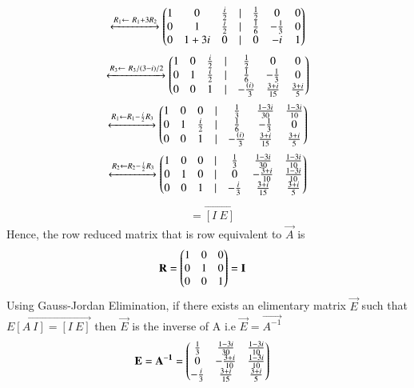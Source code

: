 \documentclass[journal,12pt,twocolumn]{IEEEtran}
\begin{document}
\begin{align}
\xleftrightarrow[]{R_1 \leftarrow \ R_1 + 3R_2}
                \begin{pmatrix} 1 & 0 & \frac{i}{2} &| & \frac{1}{2} & 0 & 0 \\
			0 & 1 & \frac{i}{2}&| & \frac{1}{6} & -\frac{1}{3} & 0 \\
			0 & 1+3i & 0 &| & 0 & -i & 1\end{pmatrix}
\end{align}
\begin{align}
\xleftrightarrow[]{R_3 \leftarrow \ R_3/(3-i)/2}
                \begin{pmatrix} 1 & 0 & \frac{i}{2} &| & \frac{1}{2} & 0 & 0 \\
			0 & 1 & \frac{i}{2}&| & \frac{1}{6} & -\frac{1}{3} & 0 \\
			0 & 0 & 1&| &-\frac{(i)}{3} & \frac{3+i}{15} & \frac{3+i}{5}\end{pmatrix}
\end{align}
\begin{align}
\xleftrightarrow[]{R_1 \leftarrow R_1-\frac{i}{2}R_3}
                \begin{pmatrix} 1 & 0 & 0 &| & \frac{1}{3} & \frac{1-3i}{30} & \frac{1-3i}{10} \\
			0 & 1 & \frac{i}{2}&| & \frac{1}{6} & -\frac{1}{3} & 0 \\
			0 & 0 & 1&| &-\frac{(i)}{3} & \frac{3+i}{15} & \frac{3+i}{5}\end{pmatrix}
\end{align}
\begin{align}
\xleftrightarrow[]{R_2 \leftarrow R_2-\frac{i}{2}R_3}
                \begin{pmatrix} 1 & 0 & 0 &| & \frac{1}{3} & \frac{1-3i}{30} & \frac{1-3i}{10} \\
			0 & 1 & 0 &| & 0 & -\frac{3+i}{10}& \frac{1-3i}{10} \\
			0 & 0 & 1&| &-\frac{i}{3} & \frac{3+i}{15} & \frac{3+i}{5}\end{pmatrix}			
\end{align}
\begin{align}
&= \vec{[I \ E]}\nonumber
\end{align}
Hence, the row reduced matrix that is row equivalent to $\vec{A}$ is 
\begin{align}
& \mathbf{R}=\begin{pmatrix}1&0&0\\0&1&0\\0&0&1\end{pmatrix}=\mathbf{I}\label{eq1}
\end{align}
Using Gauss-Jordan Elimination,
if there exists an elimentary matrix $\vec{E}$ such that $\vec{E[A \ I]=[I \ E]}$ then $\vec{E}$ is the inverse of A i.e $\vec{E}=\vec{A^{-1}}$
\begin{align}\label{eq2}
    &  \mathbf{E} = \mathbf{A^{-1}} = \begin{pmatrix} \frac{1}{3}&\frac{1-3i}{30}&\frac{1-3i}{10}\\0 & -\frac{3+i}{10}&\frac{1-3i}{10} \\
                        -\frac{i}{3} & \frac{3+i}{15} & \frac{3+i}{5}\end{pmatrix}
\end{align}
\end{document}
